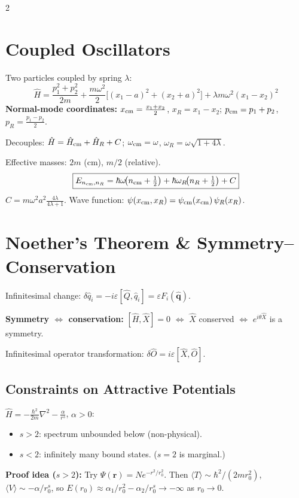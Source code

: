 \documentclass[9pt,a4paper]{article} %
\newcommand{\Hhat}{\hat{H}}
\begin{document}
\begin{multicols}{2}
\section{Coupled Oscillators}

Two particles coupled by spring $\lambda$:
\[
\Hhat=\frac{p_1^2+p_2^2}{2m}+\frac{m\omega^2}{2}\bigl[(x_1-a)^2+(x_2+a)^2\bigr]+\lambda m\omega^2(x_1-x_2)^2
\]
\textbf{Normal-mode coordinates:}
$x_{\rm cm}=\frac{x_1+x_2}{2}$,\; $x_R=x_1-x_2$;\quad
$p_{\rm cm}=p_1+p_2$,\; $p_R=\frac{p_1-p_2}{2}$.

Decouples: $\Hhat=\Hhat_{\rm cm}+\Hhat_R+C$;\quad
$\omega_{\rm cm}=\omega$,\; $\omega_R=\omega\sqrt{1+4\lambda}$.

Effective masses: $2m$ (cm), $m/2$ (relative).
\[
\boxed{E_{n_{\rm cm},n_R}=\hbar\omega\!\bigl(n_{\rm cm}+\tfrac{1}{2}\bigr)+\hbar\omega_R\!\bigl(n_R+\tfrac{1}{2}\bigr)+C}
\]
$C=m\omega^2 a^2\frac{4\lambda}{4\lambda+1}$.\quad
Wave function: $\psi(x_{\rm cm},x_R)=\psi_{\rm cm}(x_{\rm cm})\,\psi_R(x_R)$.

\section{Noether's Theorem \& Symmetry--Conservation}

Infinitesimal change: $\delta\hat{q}_i=-i\varepsilon[\hat{Q},\hat{q}_i]=\varepsilon F_i(\hat{\mathbf{q}})$.

\textbf{Symmetry $\Leftrightarrow$ conservation:}
$[\Hhat,\hat{X}]=0$ $\Leftrightarrow$ $\hat{X}$ conserved $\Leftrightarrow$ $e^{i\theta\hat{X}}$ is a symmetry.

Infinitesimal operator transformation:
$\delta\hat{O}=i\varepsilon[\hat{X},\hat{O}]$.





\subsection{Constraints on Attractive Potentials}
$\Hhat=-\frac{\hbar^2}{2m}\nabla^2-\frac{\alpha}{r^s}$, $\alpha>0$:
\begin{itemize}
  \item $s>2$: spectrum unbounded below (non-physical).
  \item $s<2$: infinitely many bound states.\; ($s=2$ is marginal.)
\end{itemize}
{\footnotesize
	\textbf{Proof idea ($s>2$):} Try $\Psi(\mathbf{r})=N e^{-r^2/r_0^2}$. Then
$\langle T\rangle\sim \hbar^2/(2mr_0^2)$, $\langle V\rangle\sim-\alpha/r_0^s$,
so $E(r_0)\approx \alpha_1/r_0^2-\alpha_2/r_0^s\to-\infty$ as $r_0\to 0$.
}


\end{multicols}
\end{document}
